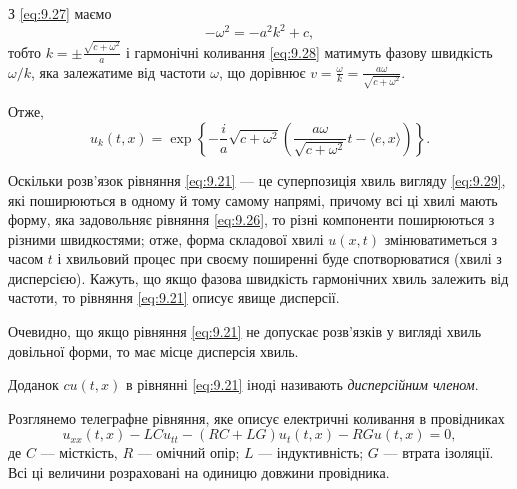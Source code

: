 З \eqref{eq:9.27} маємо
\begin{equation}
    - \omega^2 = - a^2 k^2 + c,
\end{equation}
тобто $k = \pm \frac{\sqrt{c + \omega^2}}{a}$ і гармонічні коливання \eqref{eq:9.28} матимуть фазову швидкість $\omega / k$, яка залежатиме від частоти $\omega$, що дорівнює 
$v = \frac{\omega}{k} = \frac{a \omega}{\sqrt{c + \omega^2}}$. \medskip

Отже,
\begin{equation}
    \label{eq:9.29}
    u_k (t, x) = \exp \left\{ - \frac{i}{a} \sqrt{c + \omega^2} \left( \frac{a \omega}{\sqrt{c + \omega^2}} t - \langle e, x \rangle \right) \right\}.
\end{equation}

Оскільки розв'язок рівняння \eqref{eq:9.21} --- це суперпозиція хвиль вигляду \eqref{eq:9.29}, які поширюються в одному й тому самому напрямі, причому всі ці хвилі мають форму, яка задовольняє рівняння \eqref{eq:9.26}, то різні компоненти поширюються з різними швидкостями; отже, форма складової хвилі $u(x,t)$ змінюватиметься з часом $t$ і хвильовий процес при своєму поширенні буде спотворюватися (хвилі з дисперсією). Кажуть, що якщо фазова швидкість гармонічних хвиль залежить від частоти, то рівняння \eqref{eq:9.21} описує явище дисперсії. \medskip

Очевидно, що якщо рівняння \eqref{eq:9.21} не допускає розв'язків у вигляді хвиль довільної форми, то має місце дисперсія хвиль. 

\begin{definition}
    Доданок $c u(t, x)$ в рівнянні \eqref{eq:9.21} іноді називають \textit{дисперсійним членом}.
\end{definition}

\begin{example}
    Розглянемо телеграфне рівняння, яке описує електричні коливання в провідниках
    \begin{equation}
        \label{eq:9.30}
        u_{xx}(t,x) - L C u_{tt} - (RC + LG) u_t(t,x) - RG u(t,x) = 0,
    \end{equation}
    де $C$ --- місткість, $R$ --- омічний опір; $L$ --- індуктивність; $G$ --- втрата ізоляції. Всі ці величини розраховані на одиницю довжини провідника.
\end{example}

